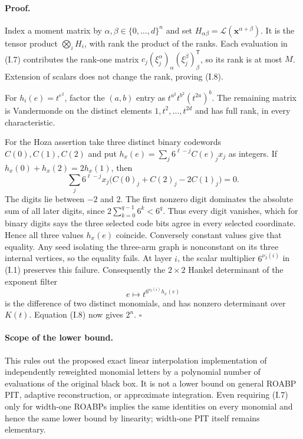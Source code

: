 \paragraph{Proof.}
Index a moment matrix by
$\alpha,\beta\in\{0,\ldots,d\}^n$ and set
$H_{\alpha\beta}=\mathcal L(\mathbf x^{\alpha+\beta})$.
It is the tensor product $\bigotimes_iH_i$, with rank the product
of the ranks.  Each evaluation in (I.7) contributes the rank-one
matrix $c_j(\xi_j^\alpha)_\alpha(\xi_j^\beta)_\beta^{\mathsf T}$,
so its rank is at most $M$.  Extension of scalars does not change
the rank, proving (I.8).

For $h_i(e)=t^{e^2}$, factor the $(a,b)$ entry as
$t^{a^2}t^{b^2}(t^{2a})^b$.  The remaining matrix is Vandermonde
on the distinct elements $1,t^2,\ldots,t^{2d}$ and has full rank,
in every characteristic.

For the Hoza assertion take three distinct binary codewords
$C(0),C(1),C(2)$ and put
$h_x(e)=\sum_j6^{\ell-j}C(e)_j x_j$ as integers.
If $h_x(0)+h_x(2)=2h_x(1)$, then
\[
 \sum_j6^{\ell-j}x_j\bigl(C(0)_j+C(2)_j-2C(1)_j\bigr)=0.
\]
The digits lie between $-2$ and $2$.  The first nonzero digit
dominates the absolute sum of all later digits, since
$2\sum_{k=0}^{q-1}6^k<6^q$.  Thus every digit vanishes, which for
binary digits says the three selected code bits agree in every
selected coordinate.  Hence all three values $h_x(e)$ coincide.
Conversely constant values give that equality.  Any seed isolating
the three-arm graph is nonconstant on its three internal vertices,
so the equality fails.  At layer $i$, the scalar multiplier
$6^{\nu_2(i)}$ in (I.1) preserves this failure.  Consequently the
$2\times2$ Hankel determinant of the exponent filter
\[
 e\longmapsto t^{6^{\nu_2(i)}h_x(e)}
\]
is the difference of two distinct monomials, and has nonzero
determinant over $K(t)$.  Equation (I.8) now gives $2^n$.
\hfill$\square$

\paragraph{Scope of the lower bound.}
This rules out the proposed exact linear interpolation implementation
of independently reweighted monomial letters by a polynomial number
of evaluations of the original black box.  It is not a lower bound
on general ROABP PIT, adaptive reconstruction, or approximate
integration.  Even requiring (I.7) only for width-one ROABPs implies
the same identities on every monomial and hence the same lower
bound by linearity; width-one PIT itself remains elementary.

